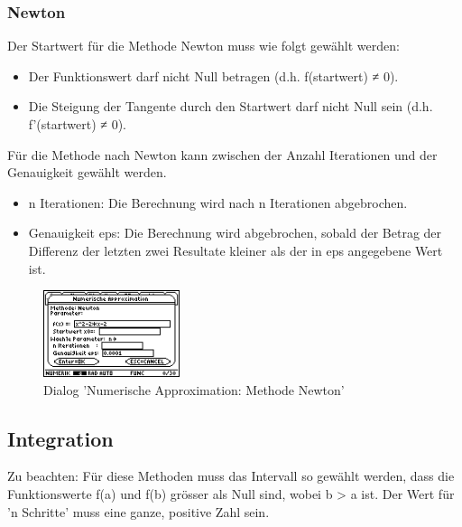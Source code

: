 \documentclass[a5paper,9pt]{scrreprt}
\begin{document}
\subsubsection*{Newton}
Der Startwert f\"ur die Methode Newton muss wie folgt gew\"ahlt werden:
\begin{itemize}
  \item Der Funktionswert darf nicht Null betragen (d.h. f(startwert) ≠ 0).
  \item Die Steigung der Tangente durch den Startwert darf nicht Null sein (d.h. f’(startwert) ≠ 0).
\end{itemize}
F\"ur die Methode nach Newton kann zwischen der Anzahl Iterationen und der Genauigkeit gew\"ahlt werden.
\begin{itemize}
  \item n Iterationen: Die Berechnung wird nach n Iterationen ab­ge­bro­chen.
  \item Genauigkeit eps: Die Berechnung wird abgebrochen, sobald der Betrag der Differenz der letzten zwei Resultate kleiner als der in eps angegebene Wert ist.
\end{itemize}
\begin{figure}[h]
  \centering
  \includegraphics[width=4cm]{img/nummeth_image022.png}
  \caption{Dialog 'Numerische Approximation: Methode Newton'}
  \label{fig:ParameterApproximationNewton}
\end{figure}

\newpage
\subsection{Integration}
Zu beachten: F\"ur diese Methoden muss das Intervall so gew\"ahlt werden, dass die Funktions­werte f(a) und f(b) gr\"osser als Null sind, wobei b > a ist. Der Wert f\"ur 'n Schritte' muss eine ganze, positive Zahl sein.
\end{document}

